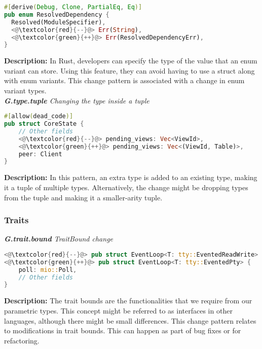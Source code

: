 \begin{lstlisting}[language=Rust, style=colouredRust]
#[derive(Debug, Clone, PartialEq, Eq)]
pub enum ResolvedDependency {
  Resolved(ModuleSpecifier),
  <@\textcolor{red}{--}@> Err(String),
  <@\textcolor{green}{++}@> Err(ResolvedDependencyErr),
}

\end{lstlisting}

\noindent\textbf{Description:} In Rust, developers can specify the type of the value that an enum variant can store. Using this feature, they can avoid having to use a struct along with enum variants. This change pattern is associated with a change in enum variant types. \\


\noindent\textit{\textbf{G.type.tuple} Changing the type inside a tuple}

\begin{lstlisting}[language=Rust, style=colouredRust]
#[allow(dead_code)]
pub struct CoreState {
    // Other fields
    <@\textcolor{red}{--}@> pending_views: Vec<ViewId>,
    <@\textcolor{green}{++}@> pending_views: Vec<(ViewId, Table)>,
    peer: Client
}
\end{lstlisting}



\noindent\textbf{Description:} In this pattern, an extra type is added to an existing type, making it a tuple of multiple types. Alternatively, the change might be dropping types from the tuple and making it a smaller-arity tuple.

\subsubsection{Traits}
\noindent\textit{\textbf{G.trait.bound} TraitBound change}

\begin{lstlisting}[language=Rust, style=colouredRust]
<@\textcolor{red}{--}@> pub struct EventLoop<T: tty::EventedReadWrite> {
<@\textcolor{green}{++}@> pub struct EventLoop<T: tty::EventedPty> {
    poll: mio::Poll,
    // Other fields
}

\end{lstlisting}

\noindent\textbf{Description:} The trait bounds are the functionalities that we require from our parametric types. This concept might be referred to as interfaces in other languages, although there might be small differences. This change pattern relates to modifications in trait bounds. This can happen as part of bug fixes or for refactoring. \\

